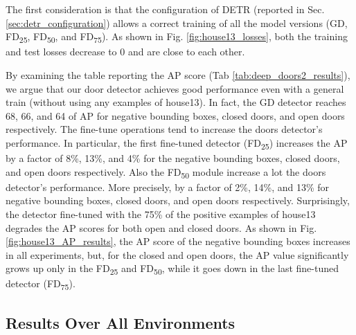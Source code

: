 The first consideration is that the configuration of DETR (reported in Sec. \ref{sec:detr_configuration}) allows  a correct training of all the model versions (\textsf{GD}, \textsf{FD\textsubscript{25}}, \textsf{FD\textsubscript{50}}, and \textsf{FD\textsubscript{75}}). As shown in Fig. \ref{fig:house13_losses}, both the training and test losses decrease to 0 and are close to each other. 

By examining the table reporting the AP score (Tab \ref{tab:deep_doors2_results}), we argue that our door detector achieves good performance even with a general train (without using any examples of {house13}). In fact, the \textsf{GD} detector reaches 68, 66, and 64 of AP for negative bounding boxes, closed doors, and open doors respectively. The fine-tune operations tend to increase the doors detector's performance. In particular, the first fine-tuned detector (\textsf{FD\textsubscript{25}}) increases the AP by a factor of 8\%, 13\%, and 4\% for the negative bounding boxes, closed doors, and open doors respectively. Also the \textsf{FD\textsubscript{50}} module increase a lot the doors detector's performance. More precisely, by a factor of 2\%, 14\%, and 13\% for negative bounding boxes, closed doors, and open doors respectively. Surprisingly, the detector fine-tuned with the 75\% of the positive examples of \textsf{house13} degrades the AP scores for both open and closed doors. As shown in Fig. \ref{fig:house13_AP_results}, the AP score of the negative bounding boxes increases in all experiments, but, for the closed and open doors, the AP value significantly grows up only in the \textsf{FD\textsubscript{25}} and \textsf{FD\textsubscript{50}}, while it goes down in the last fine-tuned detector (\textsf{FD\textsubscript{75}}).

\subsection{Results Over All Environments}

